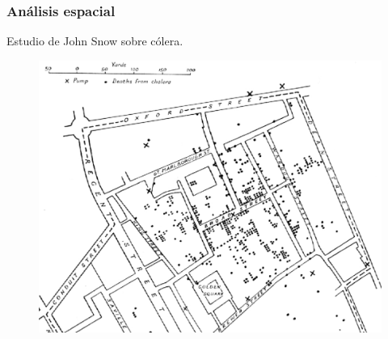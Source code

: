 \documentclass{beamer}
\begin{document}

\begin{frame}\frametitle{Análisis espacial}
	\centering Estudio de John Snow sobre cólera.
	\begin{figure}
		\centering
		\includegraphics[width=.75\textwidth]{images/mapa_3.png}
	\end{figure}
\end{frame}

\end{document}
